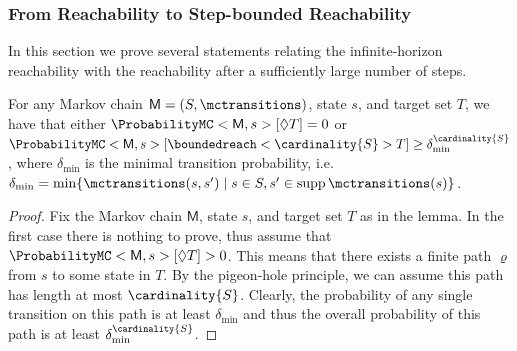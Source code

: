 \documentclass{article}
\newcommand{\MC}{\mathsf{M}}
\newcommand{\States}{S}
\newcommand{\finitepath}{\varrho}
\DeclareMathOperator{\support}{supp}
\newcommand{\reach}{\Diamond}
\newcommand{\targetset}{T}
\begin{document}
\subsubsection*{From Reachability to Step-bounded Reachability}
In this section we prove several statements relating the infinite-horizon reachability with the reachability after a sufficiently large number of steps.
\begin{lemma} \label{stm:markov_chain_minimum_reachability}
	For any Markov chain $\MC = (\States, \mctransitions)$, state $s$, and target set $\targetset$, we have that either $\ProbabilityMC<\MC, s>[\reach \targetset] = 0$ or $\ProbabilityMC<\MC, s>[\boundedreach<\cardinality{\States}> \targetset] \geq \delta_{\min}^{\cardinality{\States}}$, where $\delta_{\min}$ is the minimal transition probability, i.e.\ $\delta_{\min} = \min \{ \mctransitions(s, s') \mid s \in \States, s' \in \support \mctransitions(s) \}$.
\end{lemma}
\begin{proof}
	Fix the Markov chain $\MC$, state $s$, and target set $\targetset$ as in the lemma.
	In the first case there is nothing to prove, thus assume that $\ProbabilityMC<\MC, s>[\reach \targetset] > 0$.
	This means that there exists a finite path $\finitepath$ from $s$ to some state in $\targetset$.
	By the pigeon-hole principle, we can assume this path has length at most $\cardinality{\States}$.
	Clearly, the probability of any single transition on this path is at least $\delta_{\min}$ and thus the overall probability of this path is at least $\delta_{\min}^{\cardinality{\States}}$. 
\end{proof}
\end{document}
